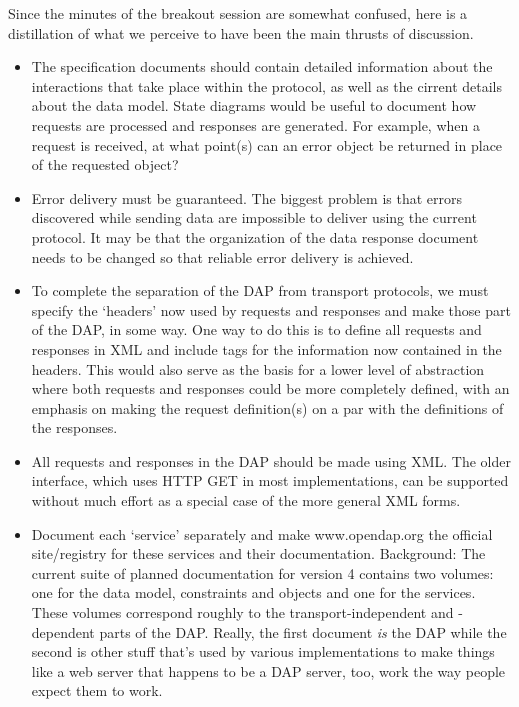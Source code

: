 Since the minutes of the breakout session are somewhat confused, here
is a distillation of what we perceive to have been the main thrusts of
discussion. 

\begin{itemize}
\item The specification documents should contain detailed information about the
  interactions that take place within the protocol, as well as the
  cirrent details about the data model.  State diagrams would be
  useful to document how requests are processed and responses are generated.
  For example, when a request is received, at what point(s) can an error
  object be returned in place of the requested object?

\item Error delivery must be guaranteed. The biggest problem is that errors
  discovered while sending data are impossible to deliver using the current
  protocol. It may be that the organization of the data response document
  needs to be changed so that reliable error delivery is achieved.

\item To complete the separation of the DAP from transport protocols, we must
  specify the `headers' now used by requests and responses and make those
  part of the DAP, in some way. One way to do this is to define all requests
  and responses in XML and include tags for the information now contained in
  the headers. This would also serve as the basis for a lower level of
  abstraction where both requests and responses could be more completely
  defined, with an emphasis on making the request definition(s) on a par
  with the definitions of the responses.

\item All requests and responses in the DAP should be made using XML. The older
  interface, which uses HTTP GET in most implementations, can be supported
  without much effort as a special case of the more general XML forms.

\item Document each `service' separately and make www.opendap.org the official
  site/registry for these services and their documentation. Background:
  The current suite of planned documentation for version 4 contains two
  volumes: one for the data model, constraints and objects and one for the
  services. These volumes correspond roughly to the transport-independent and
  -dependent parts of the DAP. Really, the first document \emph{is} the DAP while
  the second is other stuff that's used by various implementations to make
  things like a web server that happens to be a DAP server, too, work the way
  people expect them to work.


\end{itemize}
